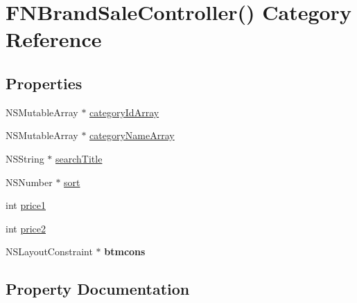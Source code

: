 \hypertarget{category_f_n_brand_sale_controller_07_08}{}\section{F\+N\+Brand\+Sale\+Controller() Category Reference}
\label{category_f_n_brand_sale_controller_07_08}
\subsection*{Properties}
\begin{DoxyCompactItemize}
\item 
N\+S\+Mutable\+Array $\ast$ \mbox{\hyperlink{category_f_n_brand_sale_controller_07_08_a4af66502c4a40bfa3f3c9dbf966d24b6}{category\+Id\+Array}}
\item 
N\+S\+Mutable\+Array $\ast$ \mbox{\hyperlink{category_f_n_brand_sale_controller_07_08_a4953f4f2bbfa596937792acf8388f302}{category\+Name\+Array}}
\item 
N\+S\+String $\ast$ \mbox{\hyperlink{category_f_n_brand_sale_controller_07_08_a13fa83b9a7b76a55e0efd7d5461c09bf}{search\+Title}}
\item 
N\+S\+Number $\ast$ \mbox{\hyperlink{category_f_n_brand_sale_controller_07_08_af283f8cae924e9f7c378c08a4b04d204}{sort}}
\item 
int \mbox{\hyperlink{category_f_n_brand_sale_controller_07_08_a29189b89fee2b8bf3eccc6725d77ea57}{price1}}
\item 
int \mbox{\hyperlink{category_f_n_brand_sale_controller_07_08_a01ce22e241478fcd9f7dabc9887c813b}{price2}}
\item 
\mbox{\label{category_f_n_brand_sale_controller_07_08_a9aece2c56c0d6058df94bd4e4f272cf1}} 
N\+S\+Layout\+Constraint $\ast$ {\bfseries btmcons}
\end{DoxyCompactItemize}


\subsection{Property Documentation}
\mbox{\label{category_f_n_brand_sale_controller_07_08_a4af66502c4a40bfa3f3c9dbf966d24b6}} 
